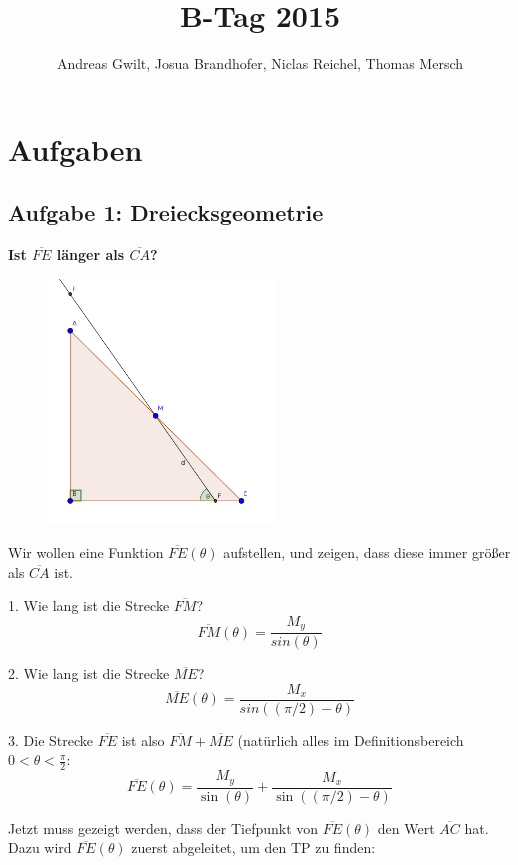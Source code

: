 \documentclass[a4paper,11pt]{article}
\title{B-Tag 2015}
\author{Andreas Gwilt, Josua Brandhofer, Niclas Reichel, Thomas Mersch}
\begin{document}
\maketitle
\tableofcontents

\newpage

\section{Aufgaben}
\subsection{Aufgabe 1: Dreiecksgeometrie}
\textbf{Ist $\overline{FE}$ länger als $\overline{CA}$?} \\

\begin{figure}[htbp] 
        \centering
        \includegraphics[width=6cm]{img/A1_1.png}
\end{figure}

Wir wollen eine Funktion $\overline{FE}(\theta)$ aufstellen, und zeigen, dass diese immer gr\"o\ss er als $\overline{CA}$ ist.

1. Wie lang ist die Strecke $\overline{FM}$?
\[ \overline{FM}(\theta) = \frac{M_y}{sin(\theta)} \]

2. Wie lang ist die Strecke $\overline{ME}$?
\[ \overline{ME}(\theta) = \frac{M_x}{sin((\pi/2)-\theta)} \]

3. Die Strecke $\overline{FE}$ ist also $\overline{FM} + \overline{ME}$ (natürlich alles im Definitionsbereich $0 < \theta < \frac{\pi}{2}$:
\[ \overline{FE}(\theta) = \frac{M_y}{\sin(\theta)} + \frac{M_x}{\sin((\pi/2)-\theta)} \]

Jetzt muss gezeigt werden, dass der Tiefpunkt von $\overline{FE}(\theta)$ den Wert $\overline{AC}$ hat. Dazu wird $\overline{FE}(\theta)$ zuerst abgeleitet, um den TP zu finden:
\end{document}
